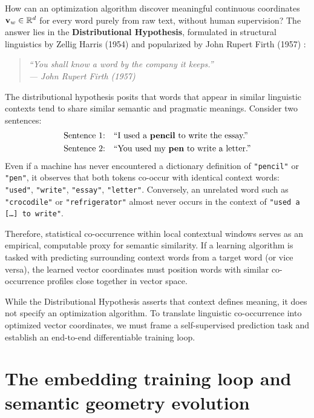 \documentclass[../../main.tex]{subfiles}
\begin{document}
How can an optimization algorithm discover meaningful continuous coordinates $\mathbf{v}_w \in \mathbb{R}^d$ for every word purely from raw text, without human supervision? The answer lies in the \textbf{Distributional Hypothesis}, formulated in structural linguistics by Zellig Harris (1954) \cite{harris1954} and popularized by John Rupert Firth (1957) \cite{firth1957}:
\begin{quote}
\centering
\itshape
``You shall know a word by the company it keeps.''\\
\upshape\hfill--- John Rupert Firth (1957) \cite{firth1957}
\end{quote}

The distributional hypothesis posits that words that appear in similar linguistic contexts tend to share similar semantic and pragmatic meanings. Consider two sentences:
\begin{align*}
\text{Sentence 1:} \quad &\text{``I used a \textbf{pencil} to write the essay.''} \\
\text{Sentence 2:} \quad &\text{``You used my \textbf{pen} to write a letter.''}
\end{align*}
Even if a machine has never encountered a dictionary definition of \texttt{"pencil"} or \texttt{"pen"}, it observes that both tokens co-occur with identical context words: \texttt{"used"}, \texttt{"write"}, \texttt{"essay"}, \texttt{"letter"}. Conversely, an unrelated word such as \texttt{"crocodile"} or \texttt{"refrigerator"} almost never occurs in the context of \texttt{"used a [\dots] to write"}.

Therefore, statistical co-occurrence within local contextual windows serves as an empirical, computable proxy for semantic similarity. If a learning algorithm is tasked with predicting surrounding context words from a target word (or vice versa), the learned vector coordinates must position words with similar co-occurrence profiles close together in vector space.

While the Distributional Hypothesis asserts that context defines meaning, it does not specify an optimization algorithm. To translate linguistic co-occurrence into optimized vector coordinates, we must frame a self-supervised prediction task and establish an end-to-end differentiable training loop.

\section{The embedding training loop and semantic geometry evolution}
\label{sec:embedding_training_loop}
\end{document}
